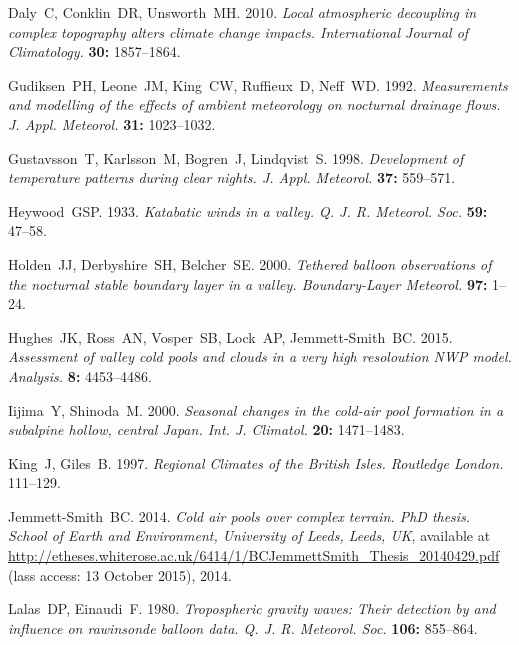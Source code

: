 \documentclass[times]{qjrms4}
\begin{document}
\begin{thebibliography}{99}
Daly~C, Conklin~DR, Unsworth~MH. 2010. \emph{Local atmospheric decoupling in complex topography alters climate change impacts. International Journal of Climatology.} {\bf 30:} 1857--1864.

Gudiksen~PH, Leone~JM, King~CW, Ruffieux~D, Neff~WD. 1992. \emph{Measurements and modelling of the effects of ambient meteorology on nocturnal drainage flows. J. Appl. Meteorol.} {\bf 31:} 1023--1032.

Gustavsson~T, Karlsson~M, Bogren~J, Lindqvist~S. 1998. \emph{Development of temperature patterns during clear nights. J. Appl. Meteorol.} {\bf 37:} 559--571.

Heywood~GSP. 1933. \emph{Katabatic winds in a valley. Q. J. R. Meteorol. Soc.} {\bf 59:} 47--58.

Holden~JJ, Derbyshire~SH, Belcher~SE. 2000. \emph{Tethered balloon observations of the nocturnal stable boundary layer in a valley. Boundary-Layer Meteorol.} {\bf 97:} 1--24.

Hughes~JK, Ross~AN, Vosper~SB, Lock~AP, Jemmett-Smith~BC. 2015. \emph{Assessment of valley cold pools and clouds in a very high resoloution NWP model. Analysis.} {\bf 8:} 4453--4486.

Iijima~Y, Shinoda~M. 2000. \emph{Seasonal changes in the cold-air pool formation in a subalpine hollow, central Japan. Int. J. Climatol.} {\bf 20:} 1471--1483.

King~J, Giles~B. 1997. \emph{Regional Climates of the British Isles. Routledge London.} 111--129.

Jemmett-Smith~BC. 2014. \emph{Cold air pools over complex terrain. PhD thesis. School of Earth and Environment, University of Leeds, Leeds, UK}, available at \url{http://etheses.whiterose.ac.uk/6414/1/BCJemmettSmith_Thesis_20140429.pdf} (lass access: 13 October 2015), 2014.

Lalas~DP, Einaudi~F. 1980. \emph{Tropospheric gravity waves: Their detection by and influence on rawinsonde balloon data. Q. J. R. Meteorol. Soc.} {\bf 106:} 855--864.


\end{thebibliography}
\end{document}
